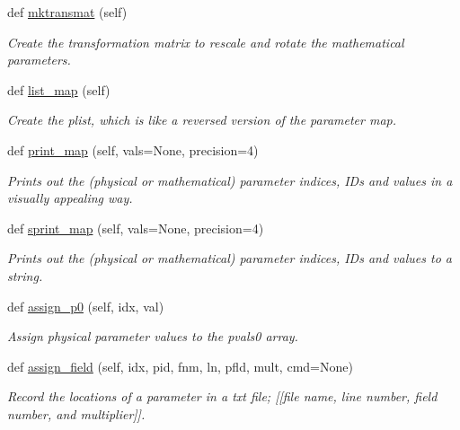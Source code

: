 \begin{DoxyCompactItemize}
def \hyperlink{classsrc_1_1forcefield_1_1FF_add591c39f6d9a4965a7c0ecefae232f6}{mktransmat} (self)
\begin{DoxyCompactList}\small\item\em Create the transformation matrix to rescale and rotate the mathematical parameters. \end{DoxyCompactList}\item 
def \hyperlink{classsrc_1_1forcefield_1_1FF_a49300acaa7a78760bc5c97d8635e6ce5}{list\+\_\+map} (self)
\begin{DoxyCompactList}\small\item\em Create the plist, which is like a reversed version of the parameter map. \end{DoxyCompactList}\item 
def \hyperlink{classsrc_1_1forcefield_1_1FF_a89b99d1b614774279870e1912f1edd3d}{print\+\_\+map} (self, vals=None, precision=4)
\begin{DoxyCompactList}\small\item\em Prints out the (physical or mathematical) parameter indices, I\+Ds and values in a visually appealing way. \end{DoxyCompactList}\item 
def \hyperlink{classsrc_1_1forcefield_1_1FF_a5118353add1d9fbe1f7865dd9b003727}{sprint\+\_\+map} (self, vals=None, precision=4)
\begin{DoxyCompactList}\small\item\em Prints out the (physical or mathematical) parameter indices, I\+Ds and values to a string. \end{DoxyCompactList}\item 
def \hyperlink{classsrc_1_1forcefield_1_1FF_adb4e62d2c1343f4dceb5a26ac9fca168}{assign\+\_\+p0} (self, idx, val)
\begin{DoxyCompactList}\small\item\em Assign physical parameter values to the \textquotesingle{}pvals0\textquotesingle{} array. \end{DoxyCompactList}\item 
def \hyperlink{classsrc_1_1forcefield_1_1FF_ac8299d9ef9a75fcfc2ddfd3621924241}{assign\+\_\+field} (self, idx, pid, fnm, ln, pfld, mult, cmd=None)
\begin{DoxyCompactList}\small\item\em Record the locations of a parameter in a txt file; \mbox{[}\mbox{[}file name, line number, field number, and multiplier\mbox{]}\mbox{]}. \end{DoxyCompactList}\item 

\end{DoxyCompactItemize}
